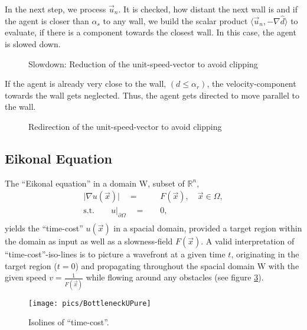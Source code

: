 In the next step, we process $\vec{u}_{n}$. It is checked, how distant the next wall is and if the agent is closer than $\alpha_s$ to any wall, we build the scalar product $\langle\vec{u}_{n},-\nabla \hat{d}\rangle$ to evaluate, if there is a component towards the closest wall. In this case, the agent is slowed down.
%
\begin{figure}[h!]
\begin{center}

\caption{Slowdown: Reduction of the unit-speed-vector to avoid clipping}
\label{slowdownfig}
\end{center}
\end{figure}
If the agent is already very close to the wall, $(d \leq \alpha_r)$, the velocity-component towards the wall gets neglected. Thus, the agent gets directed to move parallel to the wall.
%
\begin{figure}[h!]
\begin{center}

\caption{Redirection of the unit-speed-vector to avoid clipping}
\label{redirectfig}
\end{center}
\end{figure}

\subsection{Eikonal Equation}\label{eikonalequation}

The ``Eikonal equation'' in a domain \textgreek{W}, subset of $\mathbb{R}^{n}$,
\begin{align*}
\vert\nabla u(\vec{x})\vert\quad= & \quad F(\vec{x}),\quad \vec{x}\in\Omega,\\
\mathrm{s.t.}\qquad u|_{\partial\Omega}\quad= & \quad 0,\\
\end{align*}
yields the ``time-cost'' $u(\vec{x})$ in a spacial domain, provided a target region within the domain as input as well as a slowness-field $F(\vec{x})$. A valid interpretation of ``time-cost''-iso-lines is to picture a wavefront at a given time $ t $, originating in the target region ($ t=0 $) and propagating throughout the spacial domain \textgreek{W} with the given speed $v=\frac{1}{F(\vec{x})}$ while flowing around any obstacles (see figure \ref{fig:BottleneckObstaclePure}).
\begin{figure}[h!]
\texttt{[image: pics/BottleneckUPure]}
\caption{Isolines of ``time-cost''.}
\label{fig:BottleneckObstaclePure}
\end{figure}


